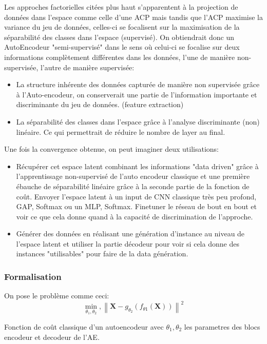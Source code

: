 Les approches factorielles citées plus haut s'apparentent à la projection de données dans l'espace comme celle d'une ACP mais tandis que l'ACP maximise la variance du jeu de données, celles-ci se focalisent sur la maximisation de la séparabilité des classes dans l'espace (supervisé). On obtiendrait donc un AutoEncodeur "semi-supervisé" dans le sens où celui-ci se focalise sur deux informations complètement différentes dans les données, l'une de manière non-supervisée, l'autre de manière supervisée:
\begin{itemize}
    \item La structure inhérente des données capturée de manière non supervisée grâce à l'Auto-encodeur, on conserverait une partie de l'information importante et discriminante du jeu de données. (feature extraction)
    \item La séparabilité des classes dans l'espace grâce à l'analyse discriminante (non) linéaire. Ce qui permettrait de réduire le nombre de layer au final.
\end{itemize}{}


Une fois la convergence obtenue, on peut imaginer deux utilisations:
\begin{itemize}
    \item Récupérer cet espace latent combinant les informations "data driven" grâce à l'apprentissage non-supervisé de l'auto encodeur classique et une première ébauche de séparabilité linéaire grâce à la seconde partie de la fonction de coût. Envoyer l'espace latent à un input de CNN classique très peu profond, GAP, Softmax ou un MLP, Softmax. Finetuner le réseau de bout en bout et voir ce que cela donne quand à la capacité de discrimination de l'approche. 
    \item Générer des données en réalisant une génération d'instance au niveau de l'espace latent et utiliser la partie décodeur pour voir si cela donne des instances "utilisables" pour faire de la data génération.
\end{itemize}

\subsubsection{Formalisation}
On pose le problème comme ceci: \newline
$$\min _{\theta_{1}, \theta_{2}},\left\|\mathbf{X}-g_{\theta_{2}}\left(f_{\theta 1}(\mathbf{X})\right)\right\|^{2}$$

Fonction de coût classique d'un autoencodeur avec $\theta_{1}, \theta_{2}$ les parametres des blocs encodeur et decodeur de l’AE. 


